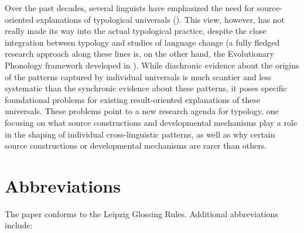 \documentclass[output=paper]{langsci/langscibook}
\begin{document}
Over the past decades, several linguists have emphasized the need for
source-oriented explanations of typological universals (\citealt{Bybee1988,Bybee2006,Bybee2008,Aristar1991,Gildea1998,Creissels2008,Otareferential,Otacompetingmotivations,Otadependencies,Anderson2016}). This
view, however, has not really made its way into the actual typological
practice, despite the close integration between typology and studies
of language change (a fully fledged research approach along these lines is, on
the other hand, the Evolutionary Phonology framework developed in
\citealt{Blevins2004}). While diachronic evidence about the origins
of the patterns captured by individual universals is much scantier and
less systematic than the synchronic evidence about these patterns, 
 it poses specific foundational problems for existing result-oriented explanations of these universals. These problems point to a
new research agenda for typology, one  focusing on what source constructions and developmental
mechanisms play a role in the shaping of individual cross-linguistic
patterns, as well as why certain source
constructions or developmental mechanisms are rarer than others.

\section*{Abbreviations}

The paper conforms to the Leipzig Glossing Rules. Additional abbreviations include:
  
\sloppy
\printbibliography[heading=subbibliography,notkeyword=this] 
\end{document}
